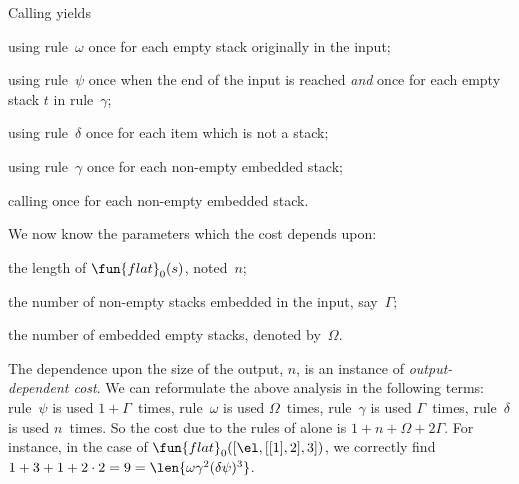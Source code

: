 Calling  yields
\begin{itemize*}

  \item using rule~\(\omega\) once for each empty stack originally in
    the input;

  \item using rule~\(\psi\) once when the end of the input is reached
    \emph{and} once for each empty stack \(t\) in rule~\(\gamma\);

  \item using rule~\(\delta\) once for each item which is not a stack;

  \item using rule~\(\gamma\) once for each non\hyp{}empty embedded
    stack;

  \item calling  once for each
    non\hyp{}empty embedded stack.

\end{itemize*}
We now know the parameters which the cost depends upon:
\begin{enumerate*}

  \item the length of
    \(\fun{flat}_0(s)\), noted~\(n\);

  \item the number of non\hyp{}empty stacks embedded in the input,
    say~\(\Gamma\);

  \item the number of embedded empty stacks, denoted by~\(\Omega\).

\end{enumerate*}
The dependence upon the size of the output, \(n\), is an instance of
\emph{output\hyp{}dependent cost}. We can reformulate the above analysis in the following
terms: rule~\(\psi\) is used \(1 + \Gamma\)~times, rule~\(\omega\) is
used \(\Omega\)~times, rule~\(\gamma\) is used \(\Gamma\)~times,
rule~\(\delta\) is used \(n\)~times. So the cost due to the rules of
 alone is \(1 + n +
\Omega + 2\Gamma\). For instance, in the case of
\(\fun{flat}_0([\el,[[1],2],3])\), we correctly find \(1 + 3 + 1 + 2
\cdot 2 = 9 = \len{\omega\gamma^2(\delta\psi)^3}\).

